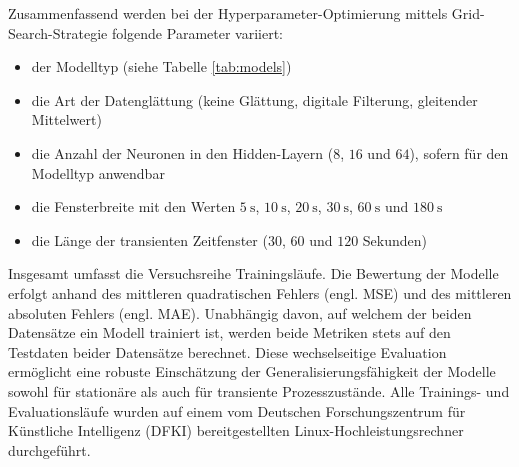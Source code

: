 %
Zusammenfassend werden bei der Hyperparameter-Optimierung mittels Grid-Search-Strategie folgende Parameter variiert:
%
\begin{itemize}
    \item der Modelltyp (siehe Tabelle \ref{tab:models})
    \item die Art der Datenglättung (keine Glättung, digitale Filterung, gleitender Mittelwert)
    \item die Anzahl der Neuronen in den Hidden-Layern ($8$, $16$ und $64$), sofern für den Modelltyp anwendbar
    \item die Fensterbreite mit den Werten $\SI{5}{\second}$, $\SI{10}{\second}$, $\SI{20}{\second}$, $\SI{30}{\second}$, $\SI{60}{\second}$ und $\SI{180}{\second}$
    \item die Länge der transienten Zeitfenster ($30$, $60$ und $120$ Sekunden)
\end{itemize}
%

%
Insgesamt umfasst die Versuchsreihe \mcNumRuns{} Trainingsläufe. Die Bewertung der Modelle erfolgt anhand des mittleren quadratischen Fehlers (engl. \ac{MSE}) und des mittleren absoluten Fehlers (engl. \ac{MAE}). Unabhängig davon, auf welchem der beiden Datensätze ein Modell trainiert ist, werden beide Metriken stets auf den Testdaten beider Datensätze berechnet. Diese wechselseitige Evaluation ermöglicht eine robuste Einschätzung der Generalisierungsfähigkeit der Modelle sowohl für stationäre als auch für transiente Prozesszustände.
Alle Trainings- und Evaluationsläufe wurden auf einem vom Deutschen Forschungszentrum für Künstliche Intelligenz (DFKI) bereitgestellten Linux-Hochleistungsrechner durchgeführt. \par
%
